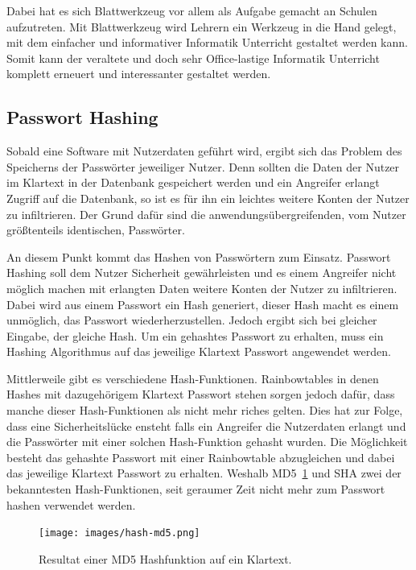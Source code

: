 \documentclass[paper=a4,fontsize=12pt,parskip=half]{scrartcl}
\begin{document}
	Dabei hat es sich Blattwerkzeug vor allem als Aufgabe gemacht an Schulen aufzutreten. Mit Blattwerkzeug wird Lehrern ein Werkzeug in die Hand gelegt, mit dem einfacher und informativer Informatik Unterricht gestaltet werden kann. Somit kann der veraltete und doch sehr Office-lastige Informatik Unterricht komplett erneuert und interessanter gestaltet werden.
	
	\subsection{Passwort Hashing}
	\label{sec:password_hashing}
	
	Sobald eine Software mit Nutzerdaten geführt wird, ergibt sich das Problem des Speicherns der Passwörter jeweiliger Nutzer.
	Denn sollten die Daten der Nutzer im Klartext in der Datenbank gespeichert werden und ein Angreifer erlangt Zugriff auf die Datenbank, so ist es für ihn ein leichtes weitere Konten der Nutzer zu infiltrieren. Der Grund dafür sind die anwendungsübergreifenden, vom Nutzer größtenteils identischen, Passwörter.
	
	An diesem Punkt kommt das Hashen von Passwörtern zum Einsatz. Passwort Hashing soll dem Nutzer Sicherheit gewährleisten und es einem Angreifer nicht möglich machen mit erlangten Daten weitere Konten der Nutzer zu infiltrieren. Dabei wird aus einem Passwort ein Hash generiert, dieser Hash macht es einem unmöglich, das Passwort wiederherzustellen. Jedoch ergibt sich bei gleicher Eingabe, der gleiche Hash. Um ein gehashtes Passwort zu erhalten, muss ein Hashing Algorithmus auf das jeweilige Klartext Passwort angewendet werden.
	
	Mittlerweile gibt es verschiedene Hash-Funktionen. Rainbowtables in denen Hashes mit dazugehörigem Klartext Passwort stehen sorgen jedoch dafür, dass manche dieser Hash-Funktionen als nicht mehr riches gelten. Dies hat zur Folge, dass eine Sicherheitslücke ensteht falls ein Angreifer die Nutzerdaten erlangt und die Passwörter mit einer solchen Hash-Funktion gehasht wurden. Die Möglichkeit besteht das gehashte Passwort mit einer Rainbowtable abzugleichen und dabei das jeweilige Klartext Passwort zu erhalten. Weshalb MD5~\ref{fig:md5} und SHA zwei der bekanntesten Hash-Funktionen, seit geraumer Zeit nicht mehr zum Passwort hashen verwendet werden.
	
	\begin{figure}[h]
		\texttt{[image: images/hash-md5.png]}
		\caption{Resultat einer MD5 Hashfunktion auf ein Klartext.}
		\label{fig:md5}
	\end{figure}
\end{document}
